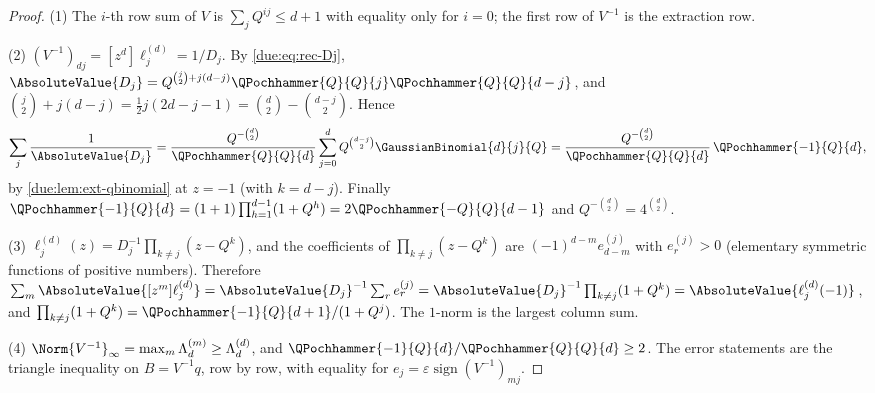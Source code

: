 \documentclass[11pt,oneside]{article}
\theoremstyle{plain}
\theoremstyle{definition}
\theoremstyle{remark}
\newcommand{\Qq}{Q}                                         %
\begin{document}
\begin{proof}
(1) The $i$-th row sum of $V$ is $\sum_{j}\Qq^{ij}\le d+1$ with equality only
for $i=0$; the first row of $V^{-1}$ is the extraction row.

(2) $(V^{-1})_{dj}=[z^{d}]\ell^{(d)}_{j}=1/D_{j}$.  By \cref{due:eq:rec-Dj},
$\AbsoluteValue{D_{j}}=\Qq^{\binom{j}{2}+j(d-j)}\QPochhammer{\Qq}{\Qq}{j}\QPochhammer{\Qq}{\Qq}{d-j}$,
and $\binom{j}{2}+j(d-j)=\tfrac12j(2d-j-1)=\binom{d}{2}-\binom{d-j}{2}$.  Hence
\[
 \sum_{j}\frac{1}{\AbsoluteValue{D_{j}}}
 =\frac{\Qq^{-\binom d2}}{\QPochhammer{\Qq}{\Qq}{d}}
  \sum_{j=0}^{d}\Qq^{\binom{d-j}{2}}\GaussianBinomial{d}{j}{\Qq}
 =\frac{\Qq^{-\binom d2}}{\QPochhammer{\Qq}{\Qq}{d}}\,\QPochhammer{-1}{\Qq}{d},
\]
by \cref{due:lem:ext-qbinomial} at $z=-1$ (with $k=d-j$).  Finally
$\QPochhammer{-1}{\Qq}{d}=(1+1)\prod_{h=1}^{d-1}(1+\Qq^{h})
=2\QPochhammer{-\Qq}{\Qq}{d-1}$ and $\Qq^{-\binom d2}=4^{\binom d2}$.

(3) $\ell^{(d)}_{j}(z)=D_{j}^{-1}\prod_{k\ne j}(z-\Qq^{k})$, and the
coefficients of $\prod_{k\ne j}(z-\Qq^{k})$ are
$(-1)^{d-m}e^{(j)}_{d-m}$ with $e^{(j)}_{r}>0$ (elementary symmetric functions
of positive numbers).  Therefore
$\sum_{m}\AbsoluteValue{[z^{m}]\ell^{(d)}_{j}}
=\AbsoluteValue{D_{j}}^{-1}\sum_{r}e^{(j)}_{r}
=\AbsoluteValue{D_{j}}^{-1}\prod_{k\ne j}(1+\Qq^{k})
=\AbsoluteValue{\ell^{(d)}_{j}(-1)}$, and
$\prod_{k\ne j}(1+\Qq^{k})=\QPochhammer{-1}{\Qq}{d+1}/(1+\Qq^{j})$.  The
$1$-norm is the largest column sum.

(4) $\Norm{V^{-1}}_{\infty}=\max_{m}\Lambda^{(m)}_{d}\ge\Lambda^{(d)}_{d}$,
and $\QPochhammer{-1}{\Qq}{d}/\QPochhammer{\Qq}{\Qq}{d}\ge2$.  The error
statements are the triangle inequality on $B=V^{-1}q$, row by row, with
equality for $e_{j}=\varepsilon\operatorname{sign}(V^{-1})_{mj}$.
\end{proof}
\end{document}
